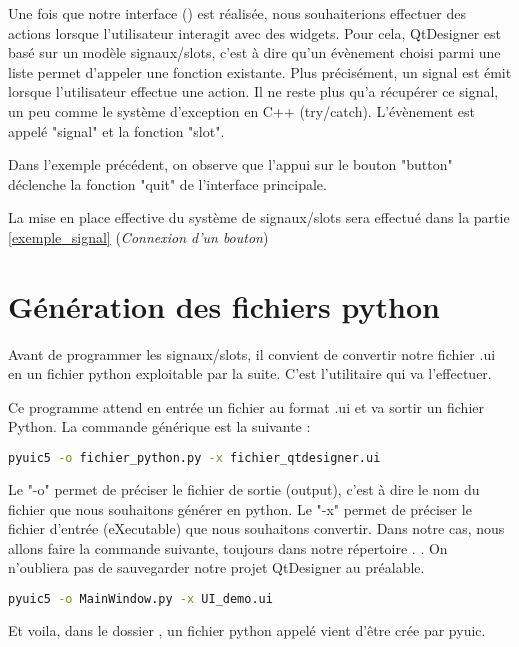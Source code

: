 Une fois que notre interface () est réalisée, nous souhaiterions effectuer des actions lorsque l'utilisateur interagit avec des widgets. \newline \newline
Pour cela, QtDesigner est basé sur un modèle signaux/slots, c'est à dire qu'un évènement choisi parmi une liste permet d'appeler une fonction existante. \newline
Plus précisément, un signal est émit lorsque l'utilisateur effectue une action. Il ne reste plus qu'a récupérer ce signal, un peu comme le système d'exception en C++ (try/catch).
L'évènement est appelé "signal" et la fonction "slot". \newline \newline



Dans l'exemple précédent, on observe que l'appui sur le bouton "button" déclenche la fonction "quit" de l'interface principale.

La mise en place effective du système de signaux/slots sera effectué dans la partie  \ref{exemple_signal} (\textit{Connexion d'un bouton})

\section{Génération des fichiers python}

Avant de programmer les signaux/slots, il convient de convertir notre fichier .ui en un fichier python exploitable par la suite. C'est l'utilitaire  qui va l'effectuer. \newline

Ce programme attend en entrée un fichier au format .ui et va sortir un fichier Python. La commande générique est la suivante : 

\begin{lstlisting}[language=bash]
pyuic5 -o fichier_python.py -x fichier_qtdesigner.ui
\end{lstlisting}

Le "-o" permet de préciser le fichier de sortie (output), c'est à dire le nom du fichier que nous souhaitons générer en python. \newline \newline
Le "-x" permet de préciser le fichier d'entrée (eXecutable) que nous souhaitons convertir. \newline \newline
Dans notre cas, nous allons faire la commande suivante, toujours dans notre répertoire . \newline.
On n'oubliera pas de sauvegarder notre projet QtDesigner au préalable.
\begin{lstlisting}[language=bash]
pyuic5 -o MainWindow.py -x UI_demo.ui
\end{lstlisting}
Et voila, dans le dossier , un fichier python appelé  vient d'être crée par pyuic. \newline

